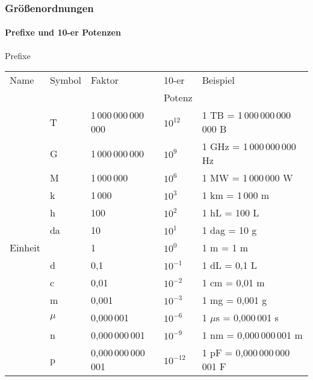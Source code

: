 \else\begin{frame}
  \frametitle{Gr\"o\ss{}enordnungen}
  \framesubtitle{Prefixe und 10-er Potenzen}
  \begin{block}{Prefixe}
    \pause 
    \begin{tabular}{@{}l*{4}{@{\,}l}@{}}
      Name     & Symbol & Faktor       & 10-er       & Beispiel \tabularnewline
      &&&                                Potenz      &  \tabularnewline\hline
      \phantom{xxxxxxxxxxxxxx} & T      & 1\,000\,000\,000\,000 & $10^{12}$ & 1 TB = 1\,000\,000\,000\,000 B \tabularnewline
      & G      & 1\,000\,000\,000 & $10^{9}$      & 1 GHz = 1\,000\,000\,000 Hz \tabularnewline
      & M      & 1\,000\,000   & $10^{6}$            & 1 MW = 1\,000\,000 W \tabularnewline
      & k      & 1\,000       & $10^3$            & 1 km = 1\,000 m \tabularnewline
      & h      & 100         & $10^2$            & 1 hL = 100 L \tabularnewline
      & da     & 10          & $10^1$            & 1 dag = 10 g \tabularnewline
      Einheit &        & 1           & $10^0$            & 1 m = 1 m \tabularnewline
      & d      & 0,1         & $10^{-1}$         & 1 dL = 0,1 L \tabularnewline
      & c      & 0,01        & $10^{-2}$         & 1 cm = 0,01 m \tabularnewline
      & m      & 0,001       & $10^{-3}$         & 1 mg = 0,001 g \tabularnewline
      & $\mu$  & 0,000\,001  & $10^{-6}$         & 1 $\mu$s = 0,000\,001 s \tabularnewline
      & n      & 0,000\,000\,001& $10^{-9}$      & 1 nm = 0,000\,000\,001 m \tabularnewline
      & p      & 0,000\,000\,000\,001& $10^{-12}$& 1 pF = 0,000\,000\,000\,001 F \tabularnewline
      \hline
    \end{tabular}
  \end{block} 
\end{frame}
\fi

